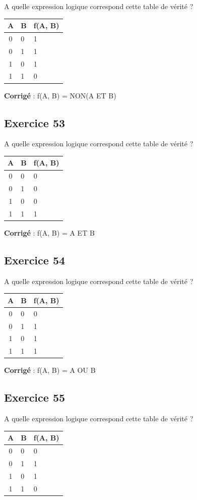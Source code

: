 \documentclass[11pt]{article}
\begin{document}
A quelle expression logique correspond cette table de vérité ?

\begin{longtable}[]{@{}cll@{}}
\toprule
A & B & f(A, B)\tabularnewline
\midrule
\endhead
0 & 0 & 1\tabularnewline
0 & 1 & 1\tabularnewline
1 & 0 & 1\tabularnewline
1 & 1 & 0\tabularnewline
\bottomrule
\end{longtable}

    \textbf{Corrigé} : f(A, B) = NON(A ET B)

    \hypertarget{exercice-53}{%
\subsection{Exercice 53}\label{exercice-53}}

A quelle expression logique correspond cette table de vérité ?

\begin{longtable}[]{@{}cll@{}}
\toprule
A & B & f(A, B)\tabularnewline
\midrule
\endhead
0 & 0 & 0\tabularnewline
0 & 1 & 0\tabularnewline
1 & 0 & 0\tabularnewline
1 & 1 & 1\tabularnewline
\bottomrule
\end{longtable}

    \textbf{Corrigé} : f(A, B) = A ET B

    \hypertarget{exercice-54}{%
\subsection{Exercice 54}\label{exercice-54}}

A quelle expression logique correspond cette table de vérité ?

\begin{longtable}[]{@{}cll@{}}
\toprule
A & B & f(A, B)\tabularnewline
\midrule
\endhead
0 & 0 & 0\tabularnewline
0 & 1 & 1\tabularnewline
1 & 0 & 1\tabularnewline
1 & 1 & 1\tabularnewline
\bottomrule
\end{longtable}

    \textbf{Corrigé} : f(A, B) = A OU B

    \hypertarget{exercice-55}{%
\subsection{Exercice 55}\label{exercice-55}}

A quelle expression logique correspond cette table de vérité ?

\begin{longtable}[]{@{}cll@{}}
\toprule
A & B & f(A, B)\tabularnewline
\midrule
\endhead
0 & 0 & 0\tabularnewline
0 & 1 & 1\tabularnewline
1 & 0 & 1\tabularnewline
1 & 1 & 0\tabularnewline
\bottomrule
\end{longtable}
\end{document}
